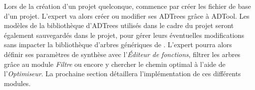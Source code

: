     Lors de la création d'un projet quelconque, \glasir{} commence par créer les fichier de base d'un projet. L'expert va alors créer ou modifier ses ADTrees grâce à ADTool. Les modèles de la bibliothèque d'ADTrees utilisés dans le cadre du projet seront également sauvegardés dans le projet, pour gérer leurs éventuelles modifications sans impacter la bibliothèque d'arbres génériques de \glasir{}. L'expert pourra alors définir ses paramètres de synthèse avec l’\emph{Éditeur de fonctions}, filtrer les arbres grâce au module \emph{Filtre} ou encore y chercher le chemin optimal à l'aide de l'\emph{Optimiseur}. La prochaine section détaillera l'implémentation de ces différents modules. 